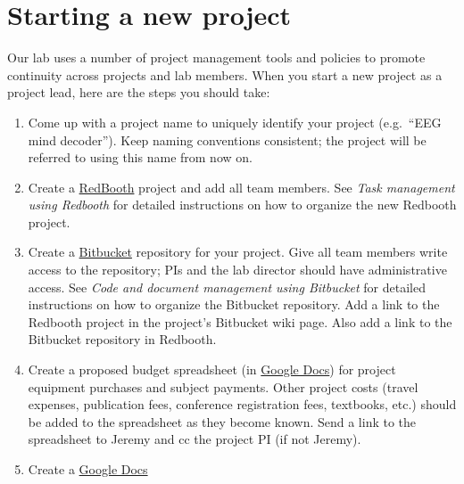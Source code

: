 \documentclass{tufte-book} %
\begin{document}
\section{Starting a new project}
Our lab uses a number of project management tools and policies to
promote continuity across projects and lab members.  When you start a
new project as a project lead, here are the steps you should
take:
\begin{enumerate}
\item Come up with a project name to uniquely identify your project
  (e.g.\ ``EEG mind decoder'').  Keep naming conventions
  consistent; the project will be referred to using this name from now on.
\item Create a
  \href{https://redbooth.com/}{RedBooth} project and add
  all team members.  See \textit{Task management using Redbooth} for
  detailed instructions on how to organize the new Redbooth project.
\item Create a \href{https://bitbucket.org/}{Bitbucket} repository for
  your project.  Give all team members write access to the repository;
  PIs and the lab director should have administrative access.  See
  \textit{Code and document management using Bitbucket} for detailed instructions on how to
  organize the Bitbucket repository.  Add a link to the Redbooth
  project in the project's Bitbucket wiki page.  Also add a link to
  the Bitbucket repository in Redbooth.
\item Create a proposed budget spreadsheet (in
  \href{https://docs.google.com/}{Google Docs}) for project equipment
  purchases and subject payments.  Other project costs (travel
  expenses, publication fees, conference registration fees, textbooks,
  etc.) should be added to the spreadsheet as they become known.  Send
  a link to the spreadsheet to Jeremy and cc the project PI (if not
  Jeremy).
\item Create a \href{https://docs.google.com/}{Google Docs}
\end{enumerate}
\end{document}
